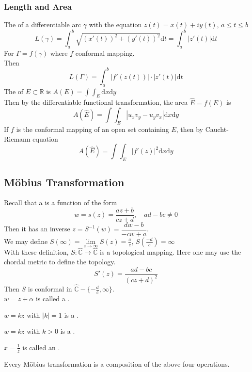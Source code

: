 \subsubsection{Length and Area}
The  of a differentiable arc  $ \gamma $ with the equation  $ z(t)=x(t)+iy(t) $, $ a \leq t \leq b $
\[L(\gamma)=\int_{a }^{b }\sqrt{(x'(t))^2+(y'(t))^2}\mathrm{d}t=\int_{a }^{b }|z'(t)|\mathrm{d}t\]   
For  $ \Gamma=f(\gamma) $ where  $ f  $ conformal mapping.\\
Then 
\[L(\Gamma)=\int_{a}^{b}|f'(z(t))|\cdot|z'(t)|\mathrm{d}t\]
The  of  $ E\subset \mathbb{R} $ is  $ A(E)=\int \int_{E}\mathrm{d}x\mathrm{d}y $\\
Then by the differentiable functional transformation, the area $ \hat{E}=f(E) $ is 
\[A(\hat{E})=\int \int_E|u_xv_y-u_yv_x|\mathrm{d}x\mathrm{d}y\]  
If  $ f  $ is the conformal mapping of an open set containing  $ E  $, then by Caucht-Riemann equation
\[A(\hat{E})=\int\int_E|f'(z)|^2\mathrm{d}x\mathrm{d}y\]
\subsection{M{\"o}bius Transformation}
Recall that a  is a function of the form
\[w=s(z)=\frac{az+b}{cz+d},\quad ad-bc\neq0\]
Then it has an inverse  $ z=S^{-1}(w)=\dfrac{dw-b}{-cw+a} $.\\
We may define  $ S(\infty)=\lim\limits_{z\to \infty}S(z)=\frac{a }{c} $, $ S(\frac{-d }{c})=\infty $ \\
With these definition,  $ S:\hat{\mathbb{C}}\rightarrow\hat{\mathbb{C}} $ is a topological mapping. Here one may use the chordal metric to define the topology.\\
\[S'(z)=\frac{ad-bc}{(cz+d)^2}\]
Then  $ S  $ is conformal in  $ \hat{\mathbb{C}}-\{-\frac{d }{c},\infty\} $.\\
$ w=z+\alpha  $ is called a .

$ w=kz  $ with  $ |k|=1 $ is a .

$ w=kz $ with  $ k>0  $ is a .

$ x=\frac{1 }{z }  $ is called an .
\begin{proposition}
    Every M{\"o}bius transformation is a composition of the above four operations.
\end{proposition}    
